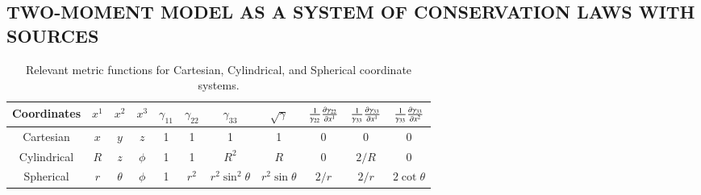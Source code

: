 \documentclass[11pt,letterpaper,twoside,english,final]{article}
\begin{document}
\subsection{TWO-MOMENT MODEL AS A SYSTEM OF CONSERVATION LAWS WITH SOURCES}

\begin{table}[h]
  \caption{Relevant metric functions for Cartesian, Cylindrical, and Spherical coordinate systems.\label{tab:metricFunctions}}
  \small
  \vspace{-6pt}
  \begin{center}
  \begin{tabular}{ccccccccccc}
    \midrule
    Coordinates & $x^{1}$ & $x^{2}$ & $x^{3}$ & $\gamma_{11}$ & $\gamma_{22}$ & $\gamma_{33}$ & $\sqrt{\gamma}$
    & $\frac{1}{\gamma_{22}}\frac{\partial \gamma_{22}}{\partial x^{1}}$ & $\frac{1}{\gamma_{33}}\frac{\partial \gamma_{33}}{\partial x^{1}}$ & $\frac{1}{\gamma_{33}}\frac{\partial \gamma_{33}}{\partial x^{2}}$ \\
    \midrule
    \midrule
    Cartesian & $x$ & $y$ & $z$ & 1 & 1 & 1 & 1 & 0 & 0 & 0 \\
    Cylindrical & $R$ & $z$ & $\phi$ & 1 & 1 & $R^{2}$ & $R$ & 0 & $2/R$ & 0 \\
    Spherical & $r$ & $\theta$ & $\phi$ & 1 & $r^{2}$ & $r^{2}\sin^{2}\theta$ & $r^{2}\sin\theta$ & $2/r$ & $2/r$ & $2\cot\theta$ \\
    \midrule
    \midrule
  \end{tabular}
  \end{center}
\end{table}
\end{document}
